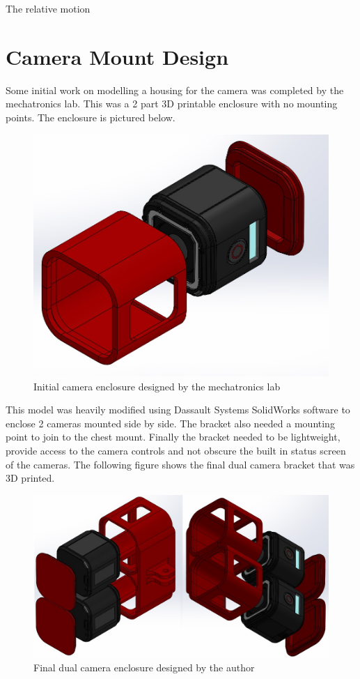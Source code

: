 The relative motion 



\section{Camera Mount Design}

Some initial work on modelling a housing for the camera was completed by the mechatronics lab. This was a 2 part 3D printable enclosure with no mounting points. The enclosure is pictured below.

\begin{figure}[!ht] 
\captionsetup{width=0.6\linewidth, font=small}  
\includegraphics[width=0.6\linewidth]{figures/sylvanexploded.JPG}
\caption{Initial camera enclosure designed by the mechatronics lab}
\label{fig:sylvanexploded}
\end{figure}

This model was heavily modified using Dassault Systems SolidWorks software to enclose 2 cameras mounted side by side. The bracket also needed a mounting point to join to the chest mount. Finally the bracket needed to be lightweight, provide access to the camera controls and not obscure the built in status screen of the cameras. The following figure shows the final dual camera bracket that was 3D printed.

\begin{figure}[!ht] 
\captionsetup{width=\linewidth, font=small}  
\includegraphics[width=\linewidth]{figures/stereoholder.JPG}
\caption{Final dual camera enclosure designed by the author}
\label{fig:stereoholder}
\end{figure}



